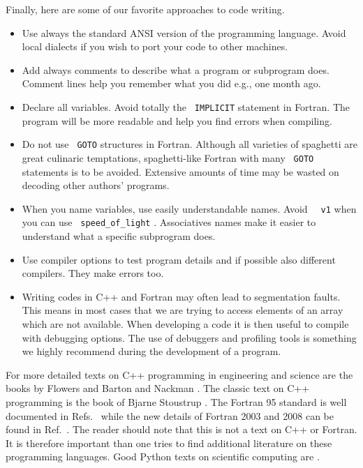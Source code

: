 Finally, here are some of our favorite  approaches to code writing.
\begin{itemize}
%
\item Use always the standard ANSI version of the programming language.
Avoid local dialects if you wish to port your code to other machines.
%
\item Add always comments to describe  what a program or subprogram does.
Comment lines help you remember what you did e.g., one month ago.
%
\item Declare all variables. Avoid totally the \verb? IMPLICIT?  statement
in Fortran. The program will be more readable and help
you find errors when compiling. 
%
\item Do not use \verb? GOTO?  structures in Fortran. Although all varieties of spaghetti
are great culinaric temptations, spaghetti-like Fortran with many \verb? GOTO?  
statements is to be avoided.
Extensive amounts of time may be wasted on decoding other authors' programs. 

%
\item When you name variables, use easily understandable
names. Avoid \verb?  v1?  when you can use
\verb? speed_of_light? . Associatives names make it
easier to understand what a specific subprogram does.
%
\item Use compiler options to test program details and if possible
also different compilers. They make errors too. 
\item Writing codes in C++ and Fortran may often lead to segmentation faults. This means in most cases that we are trying
to access elements of an array which are not available. When developing a code it is then useful to compile with debugging options.
The use of debuggers and profiling tools is something
we highly recommend during the development of a program. 

\end{itemize} 











For more detailed texts on C++ programming in engineering and
science are the books by Flowers \cite{flowers} and Barton and Nackman \cite{barton}.
The classic text on C++ programming is the book of Bjarne Stoustrup \cite{stoustrup1997}.
The Fortran 95 standard is well documented in Refs.~\cite{f95ref,metcalf1996,marshall1995}
while the
new details of Fortran 2003 and 2008 can be found in Ref.~\cite{f2003,metcalf2011}.
The reader should note that this is not a text on C++ or Fortran.
It is therefore important than one tries to find additional literature on these programming languages.
Good Python texts on scientific computing
are \cite{langtangen2006,langtangen2009}.


